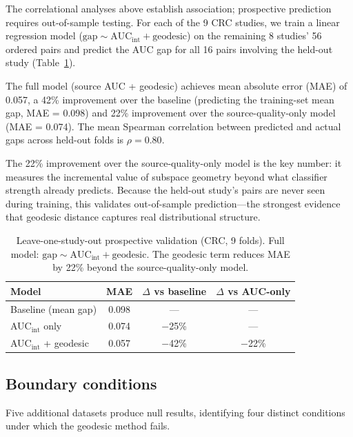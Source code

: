 \documentclass[11pt]{article}
\begin{document}
The correlational analyses above establish association; prospective prediction requires out-of-sample testing. For each of the 9 CRC studies, we train a linear regression model ($\text{gap} \sim \text{AUC}_{\mathrm{int}} + \text{geodesic}$) on the remaining 8 studies' 56 ordered pairs and predict the AUC gap for all 16 pairs involving the held-out study (Table~\ref{tab:loo}).

The full model (source AUC + geodesic) achieves mean absolute error (MAE) of 0.057, a 42\% improvement over the baseline (predicting the training-set mean gap, MAE = 0.098) and 22\% improvement over the source-quality-only model (MAE = 0.074). The mean Spearman correlation between predicted and actual gaps across held-out folds is $\rho = 0.80$.

The 22\% improvement over the source-quality-only model is the key number: it measures the incremental value of subspace geometry beyond what classifier strength already predicts. Because the held-out study's pairs are never seen during training, this validates out-of-sample prediction---the strongest evidence that geodesic distance captures real distributional structure.

\begin{table}[t]
\centering
\caption{Leave-one-study-out prospective validation (CRC, 9 folds). Full model: $\text{gap} \sim \text{AUC}_{\mathrm{int}} + \text{geodesic}$. The geodesic term reduces MAE by 22\% beyond the source-quality-only model.}
\label{tab:loo}
\begin{tabular}{lccc}
\toprule
Model & MAE & $\Delta$ vs baseline & $\Delta$ vs AUC-only \\
\midrule
Baseline (mean gap) & 0.098 & --- & --- \\
AUC$_{\mathrm{int}}$ only & 0.074 & $-$25\% & --- \\
AUC$_{\mathrm{int}}$ + geodesic & 0.057 & $-$42\% & $-$22\% \\
\bottomrule
\end{tabular}
\end{table}


\subsection{Boundary conditions}
\label{sec:boundary}

Five additional datasets produce null results, identifying four distinct conditions under which the geodesic method fails.
\end{document}
